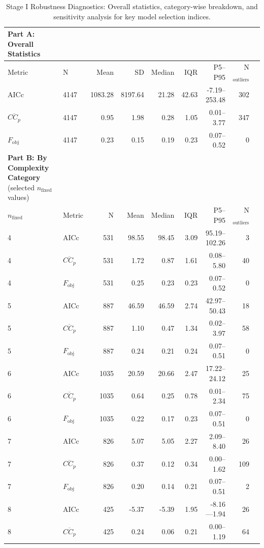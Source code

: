 \documentclass{article}
\begin{document}
\begin{table}[h!]
\centering
\caption{Stage I Robustness Diagnostics: Overall statistics, category-wise breakdown, and sensitivity analysis for key model selection indices.}
\label{tab:S1}
\small
\begin{tabular}{llrrrrrrr}
\hline
\textbf{Part A: Overall Statistics} & & & & & & & & \\
\hline
Metric & N & Mean & SD & Median & IQR & P5--P95 & N$_{\mathrm{outliers}}$ \\
\hline
AICc & 4147 & 1083.28 & 8197.64 & 21.28 & 42.63 & -7.19--253.48 & 302 \\
$\overline{CC_p}$ & 4147 & 0.95 & 1.98 & 0.28 & 1.05 & 0.01--3.77 & 347 \\
$F_{\mathrm{obj}}$ & 4147 & 0.23 & 0.15 & 0.19 & 0.23 & 0.07--0.52 & 0 \\
\hline
\textbf{Part B: By Complexity Category} (selected $n_{\mathrm{fixed}}$ values) & & & & & & & & \\
\hline
$n_{\mathrm{fixed}}$ & Metric & N & Mean & Median & IQR & P5--P95 & N$_{\mathrm{outliers}}$ \\
\hline
4 & AICc & 531 & 98.55 & 98.45 & 3.09 & 95.19--102.26 & 3 \\
4 & $\overline{CC_p}$ & 531 & 1.72 & 0.87 & 1.61 & 0.08--5.80 & 40 \\
4 & $F_{\mathrm{obj}}$ & 531 & 0.25 & 0.23 & 0.23 & 0.07--0.52 & 0 \\
5 & AICc & 887 & 46.59 & 46.59 & 2.74 & 42.97--50.43 & 18 \\
5 & $\overline{CC_p}$ & 887 & 1.10 & 0.47 & 1.34 & 0.02--3.97 & 58 \\
5 & $F_{\mathrm{obj}}$ & 887 & 0.24 & 0.21 & 0.24 & 0.07--0.51 & 0 \\
6 & AICc & 1035 & 20.59 & 20.66 & 2.47 & 17.22--24.12 & 25 \\
6 & $\overline{CC_p}$ & 1035 & 0.64 & 0.25 & 0.78 & 0.01--2.34 & 75 \\
6 & $F_{\mathrm{obj}}$ & 1035 & 0.22 & 0.17 & 0.23 & 0.07--0.51 & 0 \\
7 & AICc & 826 & 5.07 & 5.05 & 2.27 & 2.09--8.40 & 26 \\
7 & $\overline{CC_p}$ & 826 & 0.37 & 0.12 & 0.34 & 0.00--1.62 & 109 \\
7 & $F_{\mathrm{obj}}$ & 826 & 0.20 & 0.14 & 0.21 & 0.07--0.51 & 2 \\
8 & AICc & 425 & -5.37 & -5.39 & 1.95 & -8.16---1.94 & 26 \\
8 & $\overline{CC_p}$ & 425 & 0.24 & 0.06 & 0.21 & 0.00--1.19 & 64 \\

\end{tabular}
\end{table}
\end{document}
